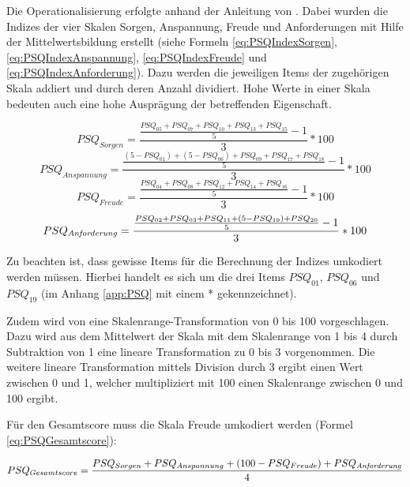 Die Operationalisierung erfolgte anhand der Anleitung von . Dabei wurden die Indizes der vier Skalen Sorgen, Anspannung, Freude und Anforderungen mit Hilfe der Mittelwertsbildung erstellt (siehe Formeln \ref{eq:PSQIndexSorgen}, \ref{eq:PSQIndexAnspannung}, \ref{eq:PSQIndexFreude} und \ref{eq:PSQIndexAnforderung}). Dazu werden die jeweiligen Items der zugehörigen Skala addiert und durch deren Anzahl dividiert. Hohe Werte in einer Skala bedeuten auch eine hohe Ausprägung der betreffenden Eigenschaft.

\begin{equation}\label{eq:PSQIndexSorgen}
    PSQ_{Sorgen}=\frac{\frac{PSQ_{05}+PSQ_{07}+PSQ_{10}+PSQ_{13}+PSQ_{15}}{5}-1}{3}*100
\end{equation}
\begin{equation}\label{eq:PSQIndexAnspannung}
    PSQ_{Anspannung}=\frac{\frac{(5-PSQ_{01})+(5-PSQ_{06})+PSQ_{09}+PSQ_{17}+PSQ_{18}}{5}-1}{3}*100
\end{equation}
\begin{equation}\label{eq:PSQIndexFreude}
    PSQ_{Freude}=\frac{\frac{PSQ_{04}+PSQ_{08}+PSQ_{12}+PSQ_{14}+PSQ_{16}}{5}-1}{3}*100
\end{equation}
\begin{equation}\label{eq:PSQIndexAnforderung}
    PSQ_{\text{\textit{Anforderung}}}=\frac{\frac{PSQ_{02}+PSQ_{03}+PSQ_{11}+(5-PSQ_{19})+PSQ_{20}}{5}-1}{3}*100
\end{equation}

Zu beachten ist, dass gewisse Items für die Berechnung der Indizes umkodiert werden müssen. Hierbei handelt es sich um die drei Items $PSQ_{01}$, $PSQ_{06}$ und $PSQ_{19}$ (im Anhang \ref{app:PSQ} mit einem * gekennzeichnet).

Zudem wird von  eine Skalenrange-Transformation von 0 bis 100 vorgeschlagen. Dazu wird aus dem Mittelwert der Skala mit dem Skalenrange von 1 bis 4 durch Subtraktion von 1 eine lineare Transformation zu 0 bis 3 vorgenommen. Die weitere lineare Transformation mittels Division durch 3 ergibt einen Wert zwischen 0 und 1, welcher multipliziert mit 100 einen Skalenrange zwischen 0 und 100 ergibt.  

Für den Gesamtscore muss die Skala Freude umkodiert werden (Formel \ref{eq:PSQGesamtscore}):

\begin{equation}\label{eq:PSQGesamtscore}
    PSQ_{Gesamtscore}=\frac{PSQ_{Sorgen}+PSQ_{Anspannung}+ (100-PSQ_{Freude})+PSQ_{\text{\textit{Anforderung}}}}{4}
\end{equation}

